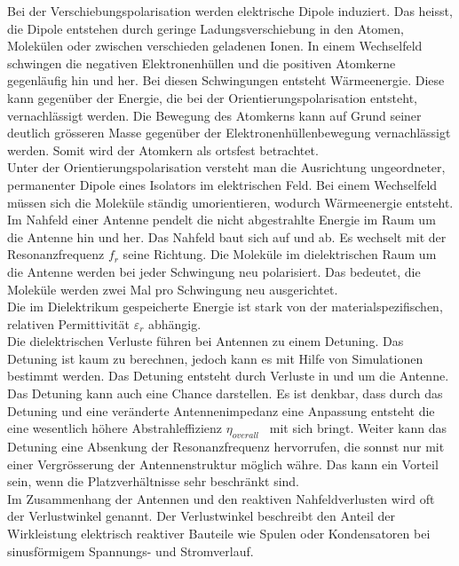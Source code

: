 Bei der Verschiebungspolarisation werden elektrische Dipole  induziert. Das heisst,  die Dipole entstehen durch geringe Ladungsverschiebung in den Atomen, Molekülen oder zwischen verschieden geladenen Ionen. In einem Wechselfeld schwingen die negativen Elektronenhüllen und die positiven Atomkerne gegenläufig hin und her.  Bei diesen Schwingungen entsteht  Wärmeenergie.  Diese kann gegenüber der Energie, die bei der Orientierungspolarisation entsteht,  vernachlässigt werden.  Die Bewegung des Atomkerns kann auf Grund seiner deutlich grösseren Masse  gegenüber der Elektronenhüllenbewegung vernachlässigt werden. Somit wird der Atomkern als ortsfest betrachtet. \\
Unter der Orientierungspolarisation versteht man die Ausrichtung ungeordneter, permanenter Dipole eines Isolators im elektrischen Feld. Bei einem Wechselfeld müssen sich die Moleküle ständig umorientieren, wodurch Wärmeenergie entsteht\cite{DielektrikumPolarisation}.\\
Im Nahfeld einer Antenne pendelt die nicht abgestrahlte Energie im Raum um die Antenne hin und her. Das Nahfeld baut sich auf und ab. Es wechselt  mit der Resonanzfrequenz $f_{r}$ seine Richtung. Die Moleküle im dielektrischen Raum um die Antenne werden bei jeder Schwingung neu polarisiert. Das bedeutet, die Moleküle werden zwei Mal pro Schwingung neu ausgerichtet.\\
Die im Dielektrikum gespeicherte Energie ist stark von der materialspezifischen, relativen Permittivität $\varepsilon_r $ abhängig.\\
Die dielektrischen Verluste führen bei Antennen  zu einem Detuning. Das Detuning ist kaum zu berechnen, jedoch kann es mit Hilfe von  Simulationen bestimmt werden. Das Detuning entsteht durch Verluste in und um die  Antenne.\\ 
Das Detuning kann auch eine Chance darstellen. Es ist denkbar, dass durch das Detuning und eine veränderte Antennenimpedanz eine Anpassung  entsteht die  eine wesentlich höhere Abstrahleffizienz $\eta_{overall}$ \ mit sich bringt. Weiter kann das Detuning eine Absenkung der Resonanzfrequenz hervorrufen, die sonnst nur mit einer Vergrösserung der Antennenstruktur möglich währe. Das kann ein Vorteil sein, wenn die Platzverhältnisse sehr beschränkt sind.\\
Im Zusammenhang der Antennen und den reaktiven Nahfeldverlusten wird oft der Verlustwinkel genannt.  Der Verlustwinkel beschreibt den Anteil der Wirkleistung elektrisch reaktiver Bauteile wie Spulen oder Kondensatoren bei sinusförmigem Spannungs- und Stromverlauf.\\
